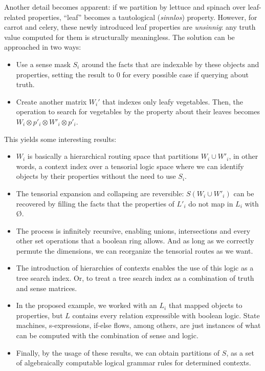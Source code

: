 \documentclass{article}
\providecommand{\tightlist}{%
  \setlength{\itemsep}{0pt}\setlength{\parskip}{0pt}}
\begin{document}
Another detail becomes apparent: if we partition by lettuce and spinach
over leaf-related properties, ``leaf'' becomes a tautological
(\emph{sinnlos}) property. However, for carrot and celery, these newly
introduced leaf properties are \emph{unsinnig}: any truth value computed
for them is structurally meaningless. The solution can be approached in
two ways:

\begin{itemize}
\item
  Use a sense mask \(S_i\) around the facts that are indexable by these
  objects and properties, setting the result to 0 for every possible
  case if querying about truth.
\item
  Create another matrix \(W_i'\) that indexes only leafy vegetables.
  Then, the operation to search for vegetables by the property about
  their leaves becomes \(W_i \otimes p'_i \otimes W'_i \otimes p'_i\).
\end{itemize}

This yields some interesting results:

\begin{itemize}
\tightlist
\item
  \(W_i\) is basically a hierarchical routing space that partitions
  \(W_i \cup W'_i\), in other words, a context index over a tensorial
  logic space where we can identify objects by their properties without
  the need to use \(S_i\).
\item
  The tensorial expansion and collapsing are reversible:
  \(S( W_i \cup W'_i)\) can be recovered by filling the facts that the
  properties of \(L'_i\) do not map in \(L_i\) with Ø.
\item
  The process is infinitely recursive, enabling unions, intersections
  and every other set operations that a boolean ring allows. And as long
  as we correctly permute the dimensions, we can reorganize the
  tensorial routes as we want.
\item
  The introduction of hierarchies of contexts enables the use of this
  logic as a tree search index. Or, to treat a tree search index as a
  combination of truth and sense matrices.
\item
  In the proposed example, we worked with an \(L_i\) that mapped objects
  to properties, but \(L\) contains every relation expressible with
  boolean logic. State machines, s-expressions, if-else flows, among
  others, are just instances of what can be computed with the
  combination of sense and logic.
\item
  Finally, by the usage of these results, we can obtain partitions of
  \(S\), as a set of algebraically computable logical grammar rules for
  determined contexts.
\end{itemize}
\end{document}
